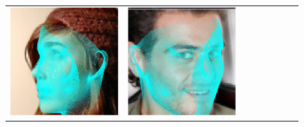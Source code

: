 \begin{figure}[t!]
\begin{center}
\begin{tabular}{ @{\hskip 1.5mm}c@{\hskip 1.5mm}c@{\hskip 1.5mm}c@{\hskip 1.5mm}c@{}c@{}c@{}c@{\hskip 1.5mm}c@{}}
\\
\includegraphics[width=\AlignFigWid]{img/results/AFLW2000/_pred_AFLW2000_overlay_1086.jpg} &
\includegraphics[width=\AlignFigWid]{img/results/AFLW2000/_pred_AFLW2000_overlay_452.jpg} &

\end{tabular}
\end{center}
\end{figure}
